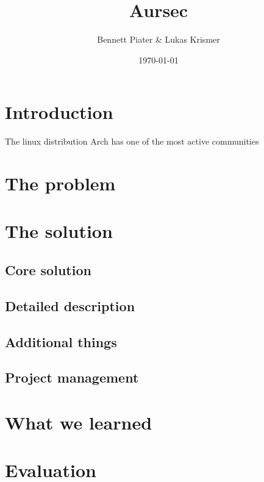 \documentclass[a4paper,11pt]{article}
\title{Aursec}
\author{Bennett Piater \& Lukas Krismer}
\date{\today}
\begin{document}
  \thispagestyle{empty}

  
  
  \begin{abstract}
  \end{abstract}

  \tableofcontents
  \listoffigures
  \listoftables
  \pagebreak


  \section{Introduction}
  The linux distribution Arch has one of the most active communities 

  \section{The problem}

  \section{The solution}
    \subsection{Core solution}
    \subsection{Detailed description}
    \subsection{Additional things}
    \subsection{Project management}

  \section{What we learned}

  \section{Evaluation}

  \pagebreak
  
  
\end{document}
